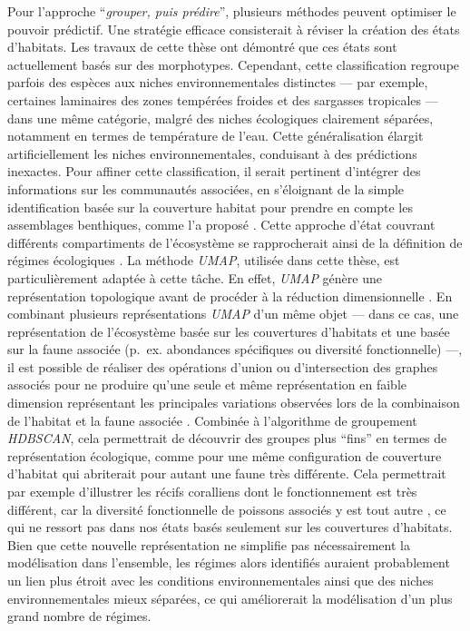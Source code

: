 \begin{refsection}
Pour l'approche ``\emph{grouper, puis prédire}'', plusieurs méthodes
peuvent optimiser le pouvoir prédictif. Une stratégie efficace
consisterait à réviser la création des états d'habitats. Les travaux de
cette thèse ont démontré que ces états sont actuellement basés sur des
morphotypes. Cependant, cette classification regroupe parfois des
espèces aux niches environnementales distinctes --- par exemple,
certaines laminaires des zones tempérées froides et des sargasses
tropicales --- dans une même catégorie, malgré des niches écologiques
clairement séparées, notamment en termes de température de l'eau. Cette
généralisation élargit artificiellement les niches environnementales,
conduisant à des prédictions inexactes. Pour affiner cette
classification, il serait pertinent d'intégrer des informations sur les
communautés associées, en s'éloignant de la simple identification basée
sur la couverture habitat pour prendre en compte les assemblages
benthiques, comme l'a proposé \textcite{Donovan_2018}. Cette approche
d'état couvrant différents compartiments de l'écosystème se
rapprocherait ainsi de la définition de régimes écologiques
\autocite{Donovan_2018}. La méthode \emph{UMAP}, utilisée dans cette
thèse, est particulièrement adaptée à cette tâche. En effet, \emph{UMAP}
génère une représentation topologique avant de procéder à la réduction
dimensionnelle \autocite{McInnes_2020}. En combinant plusieurs
représentations \emph{UMAP} d'un même objet --- dans ce cas, une
représentation de l'écosystème basée sur les couvertures d'habitats et
une basée sur la faune associée (p.~ex. abondances spécifiques ou
diversité fonctionnelle) ---, il est possible de réaliser des opérations
d'union ou d'intersection des graphes associés pour ne produire qu'une
seule et même représentation en faible dimension représentant les
principales variations observées lors de la combinaison de l'habitat et
la faune associée \autocite{McInnes_2018}. Combinée à l'algorithme de
groupement \emph{HDBSCAN}, cela permettrait de découvrir des groupes
plus ``fins'' en termes de représentation écologique, comme pour une
même configuration de couverture d'habitat qui abriterait pour autant
une faune très différente. Cela permettrait par exemple d'illustrer les
récifs coralliens dont le fonctionnement est très différent, car la
diversité fonctionnelle de poissons associés y est tout autre
\autocite{Bellwood_2019}, ce qui ne ressort pas dans nos états basés
seulement sur les couvertures d'habitats. Bien que cette nouvelle
représentation ne simplifie pas nécessairement la modélisation dans
l'ensemble, les régimes alors identifiés auraient probablement un lien
plus étroit avec les conditions environnementales ainsi que des niches
environnementales mieux séparées, ce qui améliorerait la modélisation
d'un plus grand nombre de régimes.


\end{refsection}

